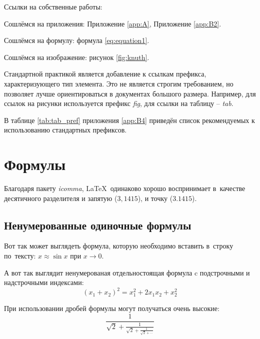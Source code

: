 %

Ссылки на собственные работы:~\cite{vakbib1, confbib1}

Сошлёмся на приложения: Приложение \ref{app:A}, Приложение \ref{app:B2}.

Сошлёмся на формулу: формула \eqref{eq:equation1}.

Сошлёмся на изображение: рисунок \ref{fig:knuth}.

Стандартной практикой является добавление к ссылкам префикса, характеризующего тип элемента.
Это не является строгим требованием, но позволяет лучше ориентироваться в документах большого размера.
Например, для ссылок на рисунки используется префикс \textit{fig},
для ссылки на таблицу -- \textit{tab}.

В таблице \ref{tab:tab_pref} приложения \ref{app:B4} приведён список рекомендуемых
к использованию стандартных префиксов.

\section{Формулы} \label{sec:ch1/sec3}

Благодаря пакету \textit{icomma}, \LaTeX~одинаково хорошо воспринимает
в~качестве десятичного разделителя и запятую ($3,1415$), и точку ($3.1415$).

\subsection{Ненумерованные одиночные формулы} \label{subsec:ch1/sec3/sub1}

Вот так может выглядеть формула, которую необходимо вставить в~строку
по~тексту: $x \approx \sin x$ при $x \to 0$.

А вот так выглядит ненумерованая отдельностоящая формула c подстрочными
и надстрочными индексами:
\[
(x_1+x_2)^2 = x_1^2 + 2 x_1 x_2 + x_2^2
\]

При использовании дробей формулы могут получаться очень высокие:
\[
  \frac{1}{\sqrt{2}+
  \displaystyle\frac{1}{\sqrt{2}+
  \displaystyle\frac{1}{\sqrt{2}+\cdots}}}
\]

